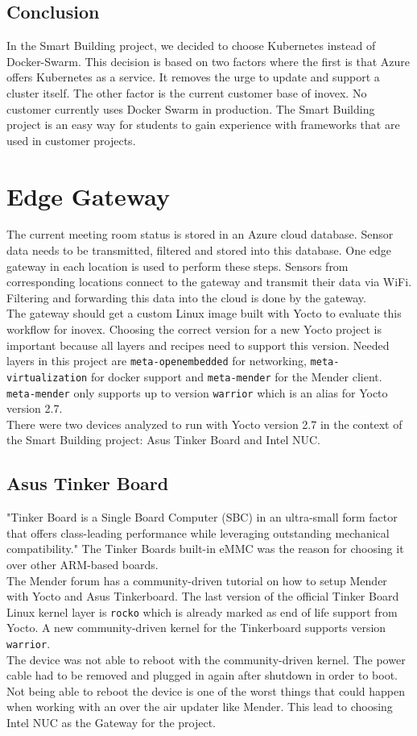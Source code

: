 \subsection{Conclusion}
In the Smart Building project, we decided to choose Kubernetes instead of Docker-Swarm. This decision is based on two factors where the first is that Azure offers Kubernetes as a service. It removes the urge to update and support a cluster itself. The other factor is the current customer base of inovex. No customer currently uses Docker Swarm in production. The Smart Building project is an easy way for students to gain experience with frameworks that are used in customer projects.

\section{Edge Gateway}
The current meeting room status is stored in an Azure cloud database. Sensor data needs to be transmitted, filtered and stored into this database. One edge gateway in each location is used to perform these steps. Sensors from corresponding locations connect to the gateway and transmit their data via WiFi. Filtering and forwarding this data into the cloud is done by the gateway.\\
The gateway should get a custom Linux image built with Yocto to evaluate this workflow for inovex. Choosing the correct version for a new Yocto project is important because all layers and recipes need to support this version. Needed layers in this project are \verb|meta-openembedded| for networking, \verb|meta-virtualization| for docker support and \verb|meta-mender| for the Mender client. \verb|meta-mender| only supports up to version \verb|warrior| which is an alias for Yocto version 2.7.\\
There were two devices analyzed to run with Yocto version 2.7 in the context of the Smart Building project: Asus Tinker Board and Intel NUC.

\subsection{Asus Tinker Board}
"Tinker Board is a Single Board Computer (SBC) in an ultra-small form factor that offers class-leading performance while leveraging outstanding mechanical compatibility."\cite{asus-tinkerboard} The Tinker Boards built-in eMMC was the reason for choosing it over other ARM-based boards.\\
The Mender forum has a community-driven tutorial on how to setup Mender with Yocto and Asus Tinkerboard.\cite{asus-mender-yocto} The last version of the official Tinker Board Linux kernel layer is \verb|rocko| which is already marked as end of life support from Yocto. A new community-driven kernel for the Tinkerboard supports version \verb|warrior|. \cite{github-meta-rockchip} \\
The device was not able to reboot with the community-driven kernel. The power cable had to be removed and plugged in again after shutdown in order to boot. Not being able to reboot the device is one of the worst things that could happen when working with an over the air updater like Mender. This lead to choosing Intel NUC as the Gateway for the project.

